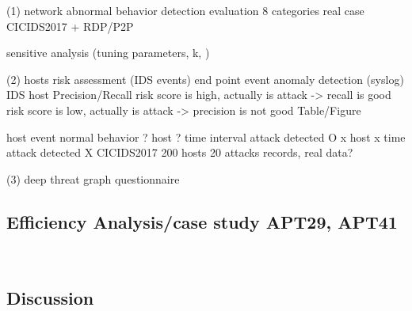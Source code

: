 (1) network abnormal behavior detection evaluation 
8 categories
real case
CICIDS2017 + RDP/P2P

sensitive analysis (tuning parameters, k, )

(2) hosts risk assessment (IDS events) end point event anomaly detection (syslog)
IDS host Precision/Recall
risk score is high, actually is attack -> recall is good
risk score is low, actually is attack -> precision is not good
Table/Figure

host event normal behavior
? host ? time interval attack detected O
x host x time attack detected X
CICIDS2017 200 hosts 20 attacks records, 
real data?

(3) deep threat graph
questionnaire

\subsection{Efficiency Analysis/case study APT29, APT41}~\label{sec:effi} 

\subsection{Discussion}~\label{sec:dis}










